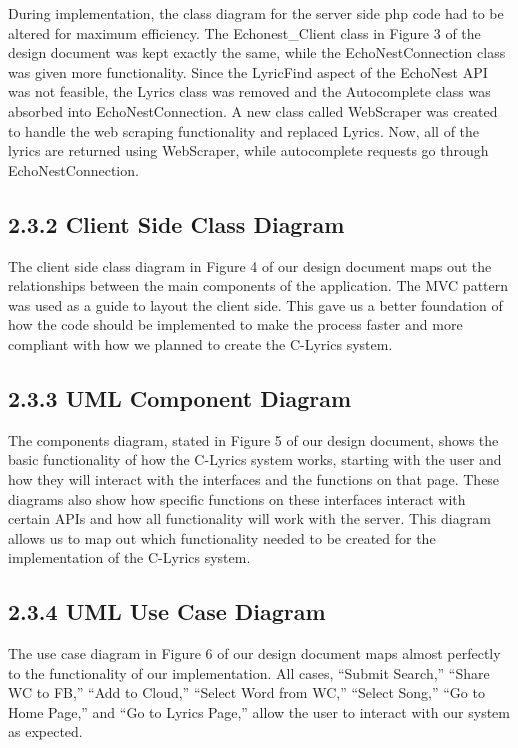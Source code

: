\documentclass[]{article}
\begin{document}
During implementation, the class diagram for the server side php code
had to be altered for maximum efficiency. The Echonest\_Client class in
Figure 3 of the design document was kept exactly the same, while the
EchoNestConnection class was given more functionality. Since the
LyricFind aspect of the EchoNest API was not feasible, the Lyrics class
was removed and the Autocomplete class was absorbed into
EchoNestConnection. A new class called WebScraper was created to handle
the web scraping functionality and replaced Lyrics. Now, all of the
lyrics are returned using WebScraper, while autocomplete requests go
through EchoNestConnection.

\subsection{\textbf{2.3.2 Client Side Class
Diagram}}\label{client-side-class-diagram}

The client side class diagram in Figure 4 of our design document maps
out the relationships between the main components of the application.
The MVC pattern was used as a guide to layout the client side. This gave
us a better foundation of how the code should be implemented to make the
process faster and more compliant with how we planned to create the
C-Lyrics system.

\subsection{\textbf{2.3.3 UML Component
Diagram}}\label{uml-component-diagram}

The components diagram, stated in Figure 5 of our design document, shows
the basic functionality of how the C-Lyrics system works, starting with
the user and how they will interact with the interfaces and the
functions on that page. These diagrams also show how specific functions
on these interfaces interact with certain APIs and how all functionality
will work with the server. This diagram allows us to map out which
functionality needed to be created for the implementation of the
C-Lyrics system.

\subsection{\textbf{2.3.4 UML Use Case
Diagram}}\label{uml-use-case-diagram}

The use case diagram in Figure 6 of our design document maps almost
perfectly to the functionality of our implementation. All cases,
``Submit Search,'' ``Share WC to FB,'' ``Add to Cloud,'' ``Select Word
from WC,'' ``Select Song,'' ``Go to Home Page,'' and ``Go to Lyrics
Page,'' allow the user to interact with our system as expected.
\end{document}
